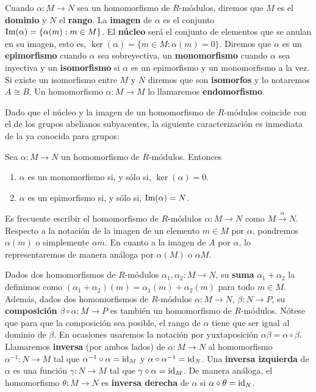 Cuando $\alpha: M \rightarrow N$ sea un homomorfismo de $R$-módulos, diremos que
$M$ es el \textbf{dominio} y $N$ el \textbf{rango}. La \textbf{imagen} de $\alpha$
es el conjunto $\operatorname{Im}(\alpha) = \{ \alpha(m) : m \in M \}$. El \textbf{núcleo} será
el conjunto de elementos que se anulan en su imagen, esto es, $\ker(\alpha) = \{
m \in M : \alpha(m) = 0 \}$. Diremos que $\alpha$ es un \textbf{epimorfismo} cuando
$\alpha$ sea sobreyectiva, un \textbf{monomorfismo} cuando $\alpha$ sea inyectiva
y un \textbf{isomorfismo} si $\alpha$ es un epimorfismo y un monomorfismo a la
vez. Si existe un isomorfismo entre $M$ y $N$ diremos que son \textbf{isomorfos}
y lo notaremos $A \cong B$. Un homomorfismo $\alpha: M \rightarrow M$ lo llamaremos
\textbf{endomorfismo}.

Dado que el núcleo y la imagen de un homomorfismo de $R$-módulos coincide con el
de los grupos abelianos subyacentes, la siguiente caracterización es inmediata de
la ya conocida para grupos:

\begin{proposicion}
	Sea $\alpha: M \to N$ un homomorfismo de $R$-módulos. Entonces
	\begin{enumerate}
		\item $\alpha$ es un monomorfismo si, y sólo si, $\ker(\alpha) = 0$.
		
		\item $\alpha$ es un epimorfismo si, y sólo si, $\operatorname{Im}(\alpha) = N$.
	\end{enumerate}
\end{proposicion}

Es frecuente escribir el homomorfismo de $R$-módulos $\alpha: M \rightarrow N$
como $M \xrightarrow{\alpha}N$. Respecto a la notación de la imagen de un elemento
$m \in M$ por $\alpha$, pondremos $\alpha(m)$ o simplemente $\alpha m$. En cuanto
a la imagen de $A$ por $\alpha$, lo representaremos de manera análoga por
$\alpha(M)$ o $\alpha M$.

Dados dos homomorfismos de $R$-módulos $\alpha_{1}, \alpha_{2}: M \rightarrow N$,
su \textbf{suma} $\alpha_{1}+ \alpha_{2}$ la definimos como
$(\alpha_{1}+ \alpha_{2})(m) = \alpha_{1}(m) + \alpha_{2}(m)$ para todo
$m \in M$. Además, dados dos homomorfismos de $R$-módulos
$\alpha: M \rightarrow N$, $\beta: N \rightarrow P$, su \textbf{composición} $\beta
\circ \alpha: M \rightarrow P$ es también un homomorfismo de $R$-módulos. Nótese
que para que la composición sea posible, el rango de $\alpha$ tiene que ser igual
al dominio de $\beta$. En ocasiones usaremos la notación por yuxtaposición
$\alpha\beta = \alpha \circ \beta$. Llamaremos \textbf{inversa} (por ambos lados)
de $\alpha : M \rightarrow N$ al homomorfismo $\alpha^{-1}: N \rightarrow M$ tal
que $\alpha^{-1}\circ \alpha = \operatorname{id}_{M}$ y $\alpha \circ \alpha^{-1}= \operatorname{id}_{N}$. Una
\textbf{inversa izquierda} de $\alpha$ es una función $\gamma: N \rightarrow M$
tal que $\gamma \circ \alpha = \operatorname{id}_{M}$. De manera análoga, el homomorfismo
$\theta : M \to N$ es \textbf{inversa derecha} de $\alpha$ si $\alpha \circ \theta
= \operatorname{id}_{N}$.

